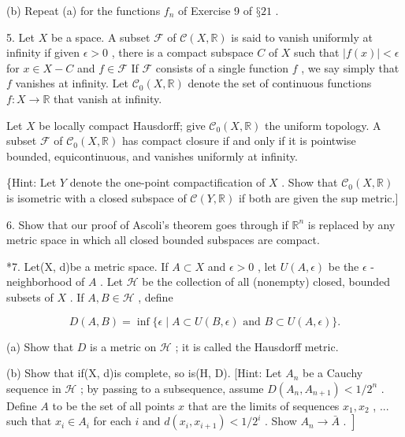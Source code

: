 (b) Repeat (a) for the functions \({f}_{n}\) of Exercise 9 of \(§{21}\) .

5. Let \(X\) be a space. A subset \(\mathcal{F}\) of \(\mathcal{C}\left( {X,\mathbb{R}}\right)\) is said to vanish uniformly at infinity if given \(\epsilon  > 0\) , there is a compact subspace \(C\) of \(X\) such that \(\left| {f\left( x\right) }\right|  < \epsilon\) for \(x \in  X - C\) and \(f \in  \mathcal{F}\) If \(\mathcal{F}\) consists of a single function \(f\) , we say simply that \(f\) vanishes at infinity. Let \({\mathcal{C}}_{0}\left( {X,\mathbb{R}}\right)\) denote the set of continuous functions \(f : X \rightarrow  \mathbb{R}\) that vanish at infinity.

\begin{theorem} Let \(X\) be locally compact Hausdorff; give \({\mathcal{C}}_{0}\left( {X,\mathbb{R}}\right)\) the uniform topology. A subset \(\mathcal{F}\) of \({\mathcal{C}}_{0}\left( {X,\mathbb{R}}\right)\) has compact closure if and only if it is pointwise bounded, equicontinuous, and vanishes uniformly at infinity.
\end{theorem}

\{Hint: Let \(Y\) denote the one-point compactification of \(X\) . Show that \({\mathcal{C}}_{0}\left( {X,\mathbb{R}}\right)\) is isometric with a closed subspace of \(\mathcal{C}\left( {Y,\mathbb{R}}\right)\) if both are given the sup metric.]

6. Show that our proof of Ascoli’s theorem goes through if \({\mathbb{R}}^{n}\) is replaced by any metric space in which all closed bounded subspaces are compact.

*7. Let(X, d)be a metric space. If \(A \subset  X\) and \(\epsilon  > 0\) , let \(U\left( {A,\epsilon }\right)\) be the \(\epsilon\) - neighborhood of \(A\) . Let \(\mathcal{H}\) be the collection of all (nonempty) closed, bounded subsets of \(X\) . If \(A,B \in  \mathcal{H}\) , define

\[
D\left( {A,B}\right)  = \inf \{ \epsilon  \mid  A \subset  U\left( {B,\epsilon }\right) \text{ and }B \subset  U\left( {A,\epsilon }\right) \} .
\]

(a) Show that \(D\) is a metric on \(\mathcal{H}\) ; it is called the Hausdorff metric.

(b) Show that if(X, d)is complete, so is(H, D). [Hint: Let \({A}_{n}\) be a Cauchy sequence in \(\mathcal{H}\) ; by passing to a subsequence, assume \(D\left( {{A}_{n},{A}_{n + 1}}\right)  < 1/{2}^{n}\) . Define \(A\) to be the set of all points \(x\) that are the limits of sequences \({x}_{1},{x}_{2}\) , ... such that \({x}_{i} \in  {A}_{i}\) for each \(i\) and \(d\left( {{x}_{i},{x}_{i + 1}}\right)  < 1/{2}^{i}\) . Show \(\left. {{A}_{n} \rightarrow  \bar{A}\text{ . }}\right\rbrack\)

